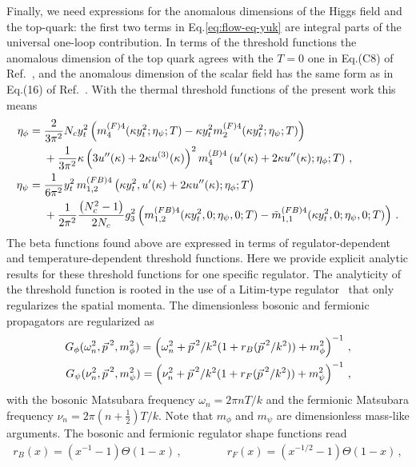 \documentclass[aps,prd,11pt,tightenlines,superscriptaddress,nofootinbib,preprintnumbers,notitlepage]{revtex4-1}
\newcommand{\qqquad}{\qquad \qquad}
\begin{document}
Finally, we need expressions for the anomalous dimensions of the Higgs
field and the top-quark: the first two terms in
Eq.\eqref{eq:flow-eq-yuk} are integral parts of the universal one-loop
contribution.  In terms of the threshold functions the anomalous
dimension of the top quark agrees with the $T=0$ one in Eq.(C8) of
Ref.~\cite{our_paper}, and the anomalous dimension of the scalar field
has the same form as in Eq.(16) of Ref.~\cite{Gies:2013fua}. With the
thermal threshold functions of the present work this means
%
\begin{align} \label{eq:anom-dim} \eta_\phi ={}& \frac{2}{3\pi^2} N_c
    y_t^2 \left(m_4^{(F)4}(\kappa y_t^2;\eta_\psi;T)
    - \kappa y_t^2 m_2^{(F)4}(\kappa y_t^2;\eta_\psi;T) \right) \notag\\  
  &+ \frac{1}{3\pi^2} \kappa \left(3 u''(\kappa) 
    + 2 \kappa u^{(3)}(\kappa)\right)^2 m_4^{(B)4}\left(u'(\kappa) 
    + 2 \kappa u''(\kappa);\eta_\phi;T\right) \,,\notag\\
\eta_\psi ={}& \frac{1}{6\pi^2} y_t^2 \, 
    m_{1,2}^{(FB)4}\left(\kappa y_t^2,u'(\kappa) + 2 \kappa u''(\kappa);\eta_\phi;T\right)\notag\\
  &+ \frac{1}{2\pi^2} \frac{\left(N_c^2-1\right)}{ 2N_c} g_3^2
    \left(m_{1,2}^{(FB)4}(\kappa y_t^2,0;\eta_\psi,0;T)
    -\tilde{m}_{1,1}^{(FB)4}(\kappa y_t^2,0;\eta_\psi,0;T)\right) \,.
\end{align}
%
The beta functions found above are expressed in terms of
regulator-dependent and temperature-dependent threshold functions.
Here we provide explicit analytic results for these threshold
functions for one specific regulator. The analyticity of the
threshold function is rooted in the use of a Litim-type
regulator~\cite{flat-reg} that only regularizes the spatial
momenta. The dimensionless bosonic and fermionic propagators are
regularized as
%
\begin{align}
 G_\phi(\omega_n^2,{\vec p\,}^2 , m_\phi^2) = 
 \left(\omega_n^2 + {\vec p\,}^2/k^2 (1+r_B({\vec p\,}^2/k^2))+m_\phi^2\right)^{-1}\,,\notag\\
 G_\psi(\nu_n^2,{\vec p\,}^2 , m_\psi^2) = 
 \left(\nu_n^2 + {\vec p\,}^2/k^2 (1+r_F({\vec p\,}^2/k^2))+m_\psi^2\right)^{-1}\,,
\end{align}
%
with the bosonic Matsubara frequency $\omega_n=2\pi n T/k$ and the
fermionic Matsubara frequency $\nu_n = 2\pi (n+\frac12)T/k$.  Note
that $m_\phi$ and $m_\psi$ are dimensionless mass-like arguments.  The
bosonic and fermionic regulator shape functions read~\cite{flat-reg}
%
\begin{align}
 r_B(x) = \left(x^{-1}-1\right)\Theta(1-x)\,,\qqquad
 r_F(x) = \left(x^{-1/2}-1\right)\Theta(1-x)\,,
 \label{eq:flat-reg}
\end{align}
\end{document}
